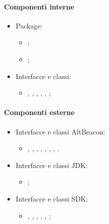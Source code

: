 \documentclass[../Funzionalita.tex]{subfiles}
\begin{document}
			\paragraph*{Componenti interne}
			\begin{itemize}
			
				\item Package:
				\begin{itemize}
					\item[] \model;
					\item[] \beacon;
				\end{itemize}
				
				\item Interfacce e classi:
				\begin{itemize}
					\item[] \BeaconManagerAdapter, \MyBeacon, \MyBeaconImp, \MyDistanceCalculator, \LocalBinder, \BeaconRanger;
				\end{itemize}
												
			\end{itemize}
			
			\paragraph*{Componenti esterne}
			\begin{itemize}
			
				\item Interfacce e classi AltBeacon:
				\begin{itemize}
					\item[] \BeaconManager, \BootstrapNotifier, \BeaconConsumer, \RangeNotifier, \Region, \BeaconParser, \DistanceCalculator, \Beacon.
				\end{itemize}
			
				\item Interfacce e classi JDK:
				\begin{itemize}
					\item[] \PriorityQueue;
				\end{itemize}
				
				\item Interfacce e classi SDK:
				\begin{itemize}
					\item[] \Intent, \LocalBroadcastManager, \Service, \Binder, \LocalBroadcastManager, \IBinder;
				\end{itemize}
				
				
				
			\end{itemize}
			
\end{document}
